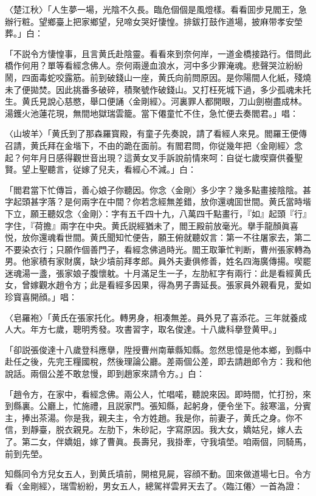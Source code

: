 〈楚江秋〉「人生夢一場，光陰不久長。臨危個個是風燈樣。看看囬步見閻王，急辦行粧。望鄉臺上把家鄉望，兒啼女哭好悽惶。排鈸打鼓作道場，披麻带孝安塋葬。」白：

「不説令方悽惶事，且言黄氏赴陰靈。看看來到奈何岸，一道金橋接路行。借問此橋作何用？單等看經念佛人。奈何兩邊血浪水，河中多少罪淹魂。悲聲哭泣紛紛鬧，四面毒蛇咬露筋。前到破錢山一座，黄氏向前問原因。是你陽間人化紙，殘燒未了便拋焚。因此挑番多破碎，積聚號作破錢山。又打枉死城下過，多少孤魂未托生。黄氏見說心慈愍，舉口便誦〈金剛經〉。河裏罪人都開眼，刀山劍樹盡成林。湯鑊火池蓮花現，無間地獄瑞雲籠。當下僊童忙不住，急忙便去奏閻君。」唱：

〈山坡羊〉「黄氏到了那森羅寳殿，有童子先奏說，請了看經人來見。閻羅王便傳召請，黄氏拜在金堦下，不由的跪在面前。有閻君問，你従幾年把〈金剛經〉念起？何年月日感得觀世音出現？這黄女叉手訴說前情來呵：自従七歲喫齋供養聖賢。望上聖聽言，従嫁了兒夫，看經心不減。」白：

「閻君當下忙傳旨，善心娘子你聽因。你念〈金剛〉多少字？幾多點畫接陰陰。甚字起頭甚字落？是何兩字在中間？你若念經無差錯，放你還魂囬世間。黄氏當時堦下立，願王聽奴念〈金剛〉：字有五千四十九，八萬四千點畫行，『如』起頭『行』字住，『荷擔』兩字在中央。黄氏説經猶未了，閻王殿前放毫光。擧手龍顏眞喜悦，放你還魂看世間。黄氏聞知忙便告，願王俯就聽奴言：第一不往屠家去，第二不要染衣行；只願作個善門子，看經念佛過時光。閻王取筆忙判断，曹州張家轉為男。他家積有家財廣，缺少墳前拜孝郎。員外夫妻俱修善，姓名四海廣傳揚。喫罷迷魂湯一盞，張家娘子腹懷躭。十月滿足生一子，左肋紅字有兩行：此是看經黄氏女，曾嫁觀水趙令方；此是看經多因果，得為男子壽延長。張家員外親看見，愛如珍寳喜開顔。」唱：

〈皂羅袍〉「黄氏在張家托化。轉男身，相凑無差。員外見了喜添花。三年就養成人大。年方七歲，聰明秀發。攻書習字，取名俊達。十八歲科擧登黄甲。」

「卻説張俊達十八歲登科應擧，陞授曹州南華縣知縣。忽然思憶是他本鄉，到縣中赴任之後，先完王糧國稅，然後理論公廳。差兩個公差，即去請趙郎令方：我和他說話。兩個公差不敢怠慢，即到趙家來請令方。」白：

「趙令方，在家中，看經念佛。兩公人，忙唱喏，聽說來因。即時間，忙打扮，來到縣裏。公廳上，忙施禮，且説家門。張知縣，起躬身，便令坐下。敍寒溫，分賓主，捧出茶湯。你是我，親夫主，令方姓趙。我是你，前妻子，黄氏之身。你不信，到靜臺，脱衣親見。左肋下，朱砂記，字寫原因。我大女，嬌姑兒，嫁人去了。第二女，伴嬌姐，嫁了曹眞。長壽兒，我掛牽，守我墳塋。咱兩個，同騎馬，前到先塋。

知縣同令方兒女五人，到黄氏墳前，開棺見屍，容顔不動。囬來做道場七日。令方看〈金剛經〉，瑞雪紛紛，男女五人，總駕祥雲昇天去了。〈臨江僊〉一首為證：

